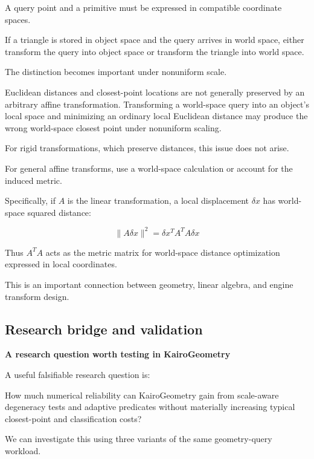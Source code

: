 A query point and a primitive must be expressed in compatible coordinate spaces.

If a triangle is stored in object space and the query arrives in world space, either transform the query into object space or transform the triangle into world space.

The distinction becomes important under nonuniform scale.

Euclidean distances and closest-point locations are not generally preserved by an arbitrary affine transformation. Transforming a world-space query into an object's local space and minimizing an ordinary local Euclidean distance may produce the wrong world-space closest point under nonuniform scaling.

For rigid transformations, which preserve distances, this issue does not arise.

For general affine transforms, use a world-space calculation or account for the induced metric.

Specifically, if \(A\) is the linear transformation, a local displacement \(\delta x\) has world-space squared distance:

\[
\|\!A\delta x\!\|^2 = \delta x^T A^T A\delta x
\]

Thus \(A^TA\) acts as the metric matrix for world-space distance optimization expressed in local coordinates.

This is an important connection between geometry, linear algebra, and engine transform design.

\subsection{Research bridge and validation}\label{03-visual-computing-i-ch021-research-bridge-and-validation}

\hypertarget{03-visual-computing-i-ch021-research-bridge-and-validation}{}

\textbf{A research question worth testing in KairoGeometry}

A useful falsifiable research question is:

How much numerical reliability can KairoGeometry gain from scale-aware degeneracy tests and adaptive predicates without materially increasing typical closest-point and classification costs?

We can investigate this using three variants of the same geometry-query workload.

